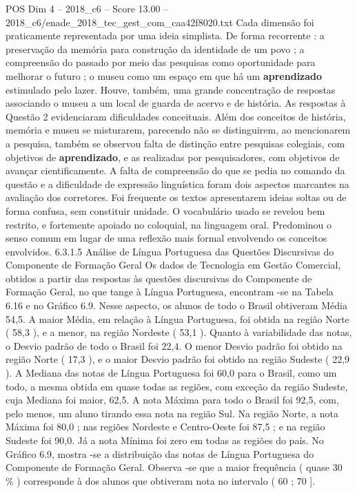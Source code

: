 \begin{textsample}{POS Dim 4 – 2018\_c6 – Score 13.00 – 2018\_c6/enade\_2018\_tec\_gest\_com\_caa42f8020.txt}
Cada dimensão foi praticamente representada por uma ideia simplista.
De forma recorrente : a preservação da memória para construção da identidade de um povo ; a compreensão do passado por meio das pesquisas como oportunidade para melhorar o futuro ; o museu como um espaço em que há um \textbf{aprendizado} estimulado pelo lazer.
Houve, também, uma grande concentração de respostas associando o museu a um local de guarda de acervo e de história.
As respostas à Questão 2 evidenciaram dificuldades conceituais.
Além dos conceitos de história, memória e museu se misturarem, parecendo não se distinguirem, ao mencionarem a pesquisa, também se observou falta de distinção entre pesquisas colegiais, com objetivos de \textbf{aprendizado}, e as realizadas por pesquisadores, com objetivos de avançar cientificamente.
A falta de compreensão do que se pedia no comando da questão e a dificuldade de expressão linguística foram dois aspectos marcantes na avaliação dos corretores.
Foi frequente os textos apresentarem ideias soltas ou de forma confusa, sem constituir unidade.
O vocabulário usado se revelou bem restrito, e fortemente apoiado no coloquial, na linguagem oral.
Predominou o senso comum em lugar de uma reflexão mais formal envolvendo os conceitos envolvidos. 6.3.1.5 Análise de Língua Portuguesa das Questões Discursivas do Componente de Formação Geral Os dados de Tecnologia em Gestão Comercial, obtidos a partir das respostas às questões discursivas do Componente de Formação Geral, no que tange à Língua Portuguesa, encontram -se na Tabela 6.16 e no Gráfico 6.9.
Nesse aspecto, os alunos de todo o Brasil obtiveram Média 54,5.
A maior Média, em relação à Língua Portuguesa, foi obtida na região Norte ( 58,3 ), e a menor, na região Nordeste ( 53,1 ).
Quanto à variabilidade das notas, o Desvio padrão de todo o Brasil foi 22,4.
O menor Desvio padrão foi obtido na região Norte ( 17,3 ), e o maior Desvio padrão foi obtido na região Sudeste ( 22,9 ).
A Mediana das notas de Língua Portuguesa foi 60,0 para o Brasil, como um todo, a mesma obtida em quase todas as regiões, com exceção da região Sudeste, cuja Mediana foi maior, 62,5.
A nota Máxima para todo o Brasil foi 92,5, com, pelo menos, um aluno tirando essa nota na região Sul.
Na região Norte, a nota Máxima foi 80,0 ; nas regiões Nordeste e Centro-Oeste foi 87,5 ; e na região Sudeste foi 90,0.
Já a nota Mínima foi zero em todas as regiões do país.
No Gráfico 6.9, mostra -se a distribuição das notas de Língua Portuguesa do Componente de Formação Geral.
Observa -se que a maior frequência ( quase 30 \% ) corresponde à dos alunos que obtiveram nota no intervalo ( 60 ; 70 ].

\end{textsample}

